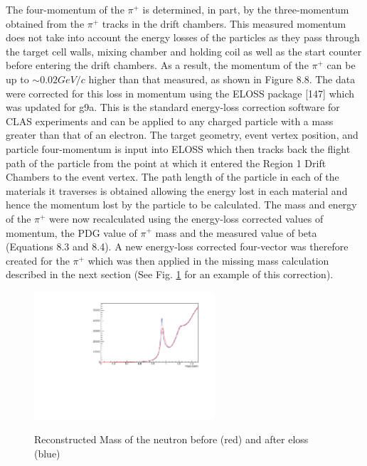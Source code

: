 The four-momentum of the $\pi^+$ is determined, in part, by the three-momentum obtained from the $\pi^+$ tracks in the drift chambers. This measured momentum does not take into account the energy losses of the particles as they pass through the target cell walls, mixing chamber and holding coil as well as the start counter before entering the drift chambers. As a result, the momentum of the $\pi^+$ can be up to $\sim 0.02 GeV/c$ higher than that measured, as shown in Figure 8.8.
The data were corrected for this loss in momentum using the ELOSS package [147] which was updated for g9a. This is the standard energy-loss correction software for CLAS experiments and can be applied to any charged particle with a mass greater than that of an electron. The target geometry, event vertex position, and particle four-momentum is input into ELOSS which then tracks back the flight path of the particle from the point at which it entered the Region 1 Drift Chambers to the event vertex. The path length of the particle in each of the materials it traverses is obtained allowing the energy lost in each material and hence the momentum lost by the particle to be calculated. The mass and energy of the $\pi^+$ were now recalculated using the energy-loss corrected values of momentum, the PDG value of $\pi^+$ mass and the measured value of beta (Equations 8.3 and 8.4). A new energy-loss corrected four-vector was therefore created for the $\pi^+$ which was then applied in the missing mass calculation described in the next section (See Fig. \ref{fig:eloss_comp} for an example of this correction).
\begin{figure}[htb]
  \begin{center}
    \includegraphics[width=0.6\textwidth]{figures/eloss_comp.pdf} \\
    \caption{Reconstructed Mass of the neutron before (red) and after eloss (blue)}
    \label{fig:eloss_comp}
  \end{center}
\end{figure}



